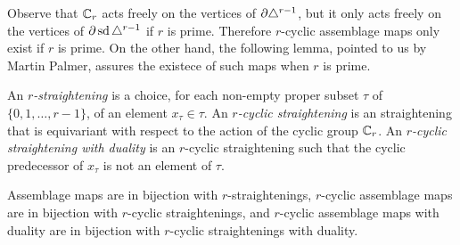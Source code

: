 
Observe that $\mathbb{C}_r$ acts freely on the vertices of $\partial \triangle^{r-1}$, but it only acts freely on the vertices of $\partial \operatorname{sd}\triangle^{r-1}$ if $r$ is prime. Therefore $r$-cyclic assemblage maps only exist if $r$ is prime. On the other hand, the following lemma, pointed to us by Martin Palmer, assures the existece of such maps when $r$ is prime.

\begin{definition}
	An \emph{$r$-straightening} is a choice, for each non-empty proper subset $\tau$ of $\{0,1,\dots,r-1\}$, of an element $x_\tau\in \tau$. An \emph{$r$-cyclic straightening} is an straightening that is equivariant with respect to the action of the cyclic group $\mathbb{C}_r$. An \emph{$r$-cyclic straightening with duality} is an $r$-cyclic straightening such that the cyclic predecessor of $x_\tau$ is not an element of $\tau$.
\end{definition}

\begin{lemma}\label{lemma:straightening}
	Assemblage maps are in bijection with $r$-straightenings, $r$-cyclic assemblage maps are in bijection with $r$-cyclic straightenings, and $r$-cyclic assemblage maps with duality are in bijection with $r$-cyclic straightenings with duality.
\end{lemma}

